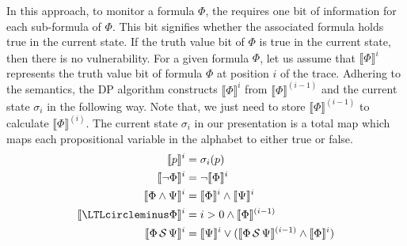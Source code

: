 In this approach,
to monitor a \pltl formula $\Phi$, the \monitor requires one bit of information
for each sub-formula of $\Phi$. This bit signifies whether the associated formula
holds true in the current state. If the truth value bit of $\Phi$ is true
in the current state, then there is no vulnerability.
For a given \pltl formula $\Phi$, let us assume
that $\llbracket\Phi\rrbracket^i$ represents the truth value bit of formula $\Phi$
at position $i$ of the trace. Adhering to the \pltl semantics,
the DP algorithm constructs
$\llbracket\Phi\rrbracket^i$ from $\llbracket\Phi\rrbracket^{(i-1)}$ and the current
state $\sigma_i$ in the following way. Note that, we just need to store $\llbracket\Phi\rrbracket^{(i-1)}$
to calculate $\llbracket\Phi\rrbracket^{(i)}$.
The current state $\sigma_i$ in our presentation is a total map which maps
each propositional variable in the alphabet  to either true or false.
\begin{align*}
\llbracket p \rrbracket^i  &=  \sigma_i(p)\\
\llbracket\neg\Phi\rrbracket^i &= \neg\llbracket\Phi\rrbracket^{i}\\
\llbracket\Phi\wedge\Psi\rrbracket^i &= \llbracket\Phi\rrbracket^{i} \wedge \llbracket\Psi\rrbracket^{i}\\
\llbracket\yesterday\Phi\rrbracket^i &= i>0 \wedge  \llbracket\Phi\rrbracket^{(i-1)}\\
\llbracket\Phi\since\Psi\rrbracket^i &= \llbracket\Psi\rrbracket^{i} \vee (\llbracket\Phi\since\Psi\rrbracket^{(i-1)}\wedge \llbracket\Phi\rrbracket^{i})
\end{align*}
\label{sec:pltl_description}
